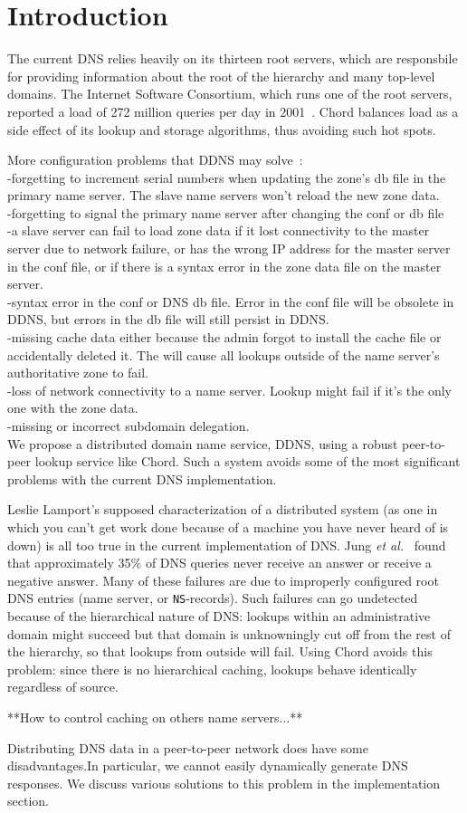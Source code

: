 \section{Introduction}

The current DNS relies heavily on its
thirteen root servers, which are responsbile for providing
information about the root of the hierarchy and many top-level domains.
The Internet Software Consortium, which runs one of the root servers,
reported a load of 272 million queries per day in 2001~\cite{isc-root}.
Chord balances load as a side effect of its lookup and storage 
algorithms, thus avoiding such hot spots.

More configuration problems that DDNS may solve~\cite{dns-bind}:\\
-forgetting to increment serial numbers when updating the zone's db file 
in the primary name server. The slave name servers won't reload
the new zone data.\\
-forgetting to signal the primary name server after changing the conf or db file\\
-a slave server can fail to load zone data if it lost connectivity to 
the master server due to network failure, or has the wrong IP address for
the master server in the conf file, or if there is a syntax error in 
the zone data file on the master server.\\
-syntax error in the conf or DNS db file. Error in the conf file will 
be obsolete in DDNS, but errors in the db file will still persist in DDNS.\\
-missing cache data either because the admin forgot to install the 
cache file or accidentally deleted it. The will cause all lookups outside 
of the name server's authoritative zone to fail.\\
-loss of network connectivity to a name server. Lookup might fail if it's
the only one with the zone data.\\
-missing or incorrect subdomain delegation.\\

We propose a distributed domain name service, DDNS,
using a robust peer-to-peer lookup service like Chord.
Such a system avoids some of the most significant
problems with the current DNS implementation.
 
Leslie Lamport's supposed characterization of a
distributed system (as one in which you can't get work
done because of a machine you have never heard of is down)
is all too true in the current implementation of {DNS}.
Jung {\it et al.}~\cite{dnscache:sigcommimw01} found that approximately
35\% of DNS queries never receive an answer or receive
a negative answer.
Many of these failures are due to improperly configured
root DNS entries (name server, or {\tt NS}-records).
Such failures can go undetected because of the hierarchical
nature of DNS: lookups within an administrative domain might
succeed but that domain is unknowningly cut off from the rest
of the hierarchy, so that lookups from outside will fail.
Using Chord avoids this problem: since there is no hierarchical
caching, lookups behave identically regardless of source.

**How to control caching on others name servers...**

Distributing DNS data in a peer-to-peer network does have some
disadvantages.In particular, we cannot easily dynamically 
generate DNS responses. We discuss various solutions to 
this problem in the implementation section.



